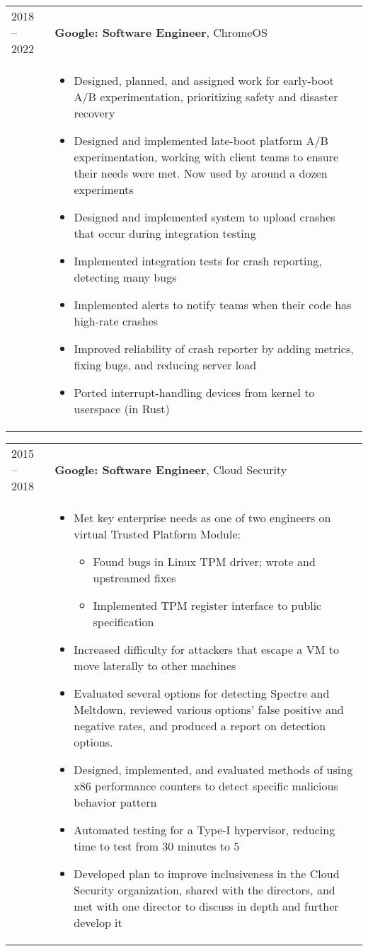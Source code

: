 \documentclass[overlapped]{res} \usepackage{hyperref}
\newcommand{\experience}[5]{
  \hspace{-9ex}
  \begin{tabular}{m{12ex} m{\textwidth}}
    #1 -- #2 & \textbf{#3}, #4 \\
    & #5
  \end{tabular}
  \vspace{-3ex}
}
\begin{document}
\begin{resume}
  \experience{2018}{2022}{Google: Software Engineer}{ChromeOS}{
    \begin{itemize} \itemsep -1pt
        \item Designed, planned, and assigned work for early-boot A/B
          experimentation, prioritizing safety and disaster recovery
       \item Designed and implemented late-boot platform A/B experimentation,
         working with client teams to ensure their needs were met. Now used by
         around a dozen experiments
        \item Designed and implemented system to upload crashes that occur
          during integration testing
        \item Implemented integration tests for crash reporting, detecting many
          bugs
        \item Implemented alerts to notify teams when their code has high-rate
          crashes
        \item Improved reliability of crash reporter by adding metrics, fixing
          bugs, and reducing server load
        \item Ported interrupt-handling devices from kernel to userspace
          (in Rust)
    \end{itemize}
  }

  \experience{2015}{2018}{Google: Software Engineer}{Cloud Security}{
    \begin{itemize} \itemsep -1pt
        \item Met key enterprise needs as one of two engineers on virtual
          Trusted Platform Module:
          \vspace{-0.5em}
          \begin{itemize} \itemsep -1pt
            \item Found bugs in Linux TPM driver; wrote and upstreamed fixes
            \item Implemented TPM register interface to public specification
          \end{itemize}
        \item Increased difficulty for attackers that escape a VM to move
          laterally to other machines
        \item Evaluated several options for detecting Spectre and Meltdown,
          reviewed various options' false positive and negative rates, and
          produced a report on detection options.
        \item Designed, implemented, and evaluated methods of using x86
          performance counters to detect specific malicious behavior pattern
        \item Automated testing for a Type-I hypervisor, reducing time to test
          from 30 minutes to 5
        \item Developed plan to improve inclusiveness in the Cloud Security
          organization, shared with the directors, and met with one director to
          discuss in depth and further develop it
    \end{itemize}
  }


\end{resume}
\end{document}
